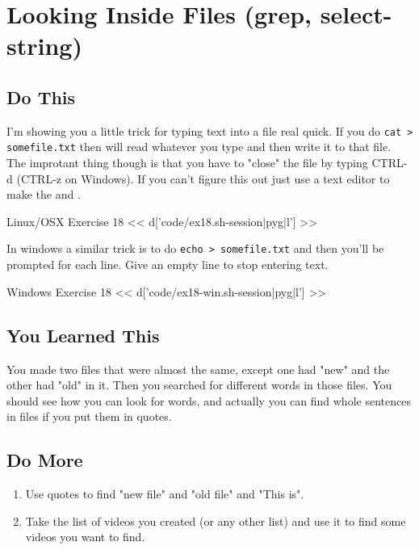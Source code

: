 \chapter{Looking Inside Files (grep, select-string)}

\section{Do This}

I'm showing you a little trick for typing text into a file real quick.  If you
do \verb|cat > somefile.txt| then  will read whatever you type and
then write it to that file.  The improtant thing though is that you have to
"close" the file by typing CTRL-d (CTRL-z on Windows).  If you can't figure this 
out just use a text editor to make the  and .

\begin{code}{Linux/OSX Exercise 18}
<< d['code/ex18.sh-session|pyg|l'] >>
\end{code}

In windows a similar trick is to do \verb|echo > somefile.txt| and then you'll
be prompted for each line.  Give an empty line to stop entering text.

\begin{code}{Windows Exercise 18}
<< d['code/ex18-win.sh-session|pyg|l'] >>
\end{code}

\section{You Learned This}

You made two files that were almost the same, except one had "new" and the other 
had "old" in it.  Then you searched for different words in those files.  You should
see how you can look for words, and actually you can find whole sentences in
files if you put them in quotes.

\section{Do More}

\begin{enumerate}
\item Use quotes to find "new file" and "old file" and "This is".
\item Take the list of videos you created (or any other list) and use it to find some videos you want to find.
\end{enumerate}

